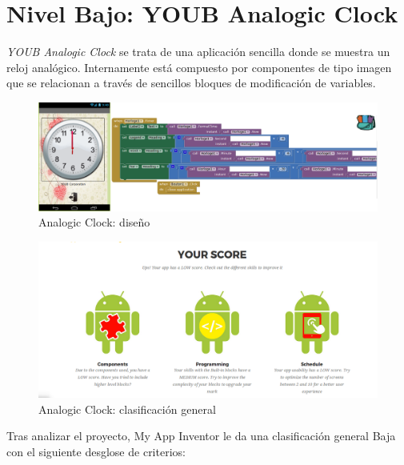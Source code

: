 \documentclass[a4paper, 12pt]{book}
\begin{document}
\section{Nivel Bajo: YOUB Analogic Clock} 
\textit{YOUB Analogic Clock} se trata de una aplicación sencilla donde se muestra un reloj analógico. Internamente está compuesto por componentes de tipo imagen que se relacionan a través de sencillos bloques de modificación de variables. 
\begin{figure}[H]
  \centering
  \includegraphics[width=\linewidth, keepaspectratio]{img/AnalogiClock}
  \caption{Analogic Clock: diseño}
  \label{fig:AnalogiClock}
\end{figure}
\begin{figure}[H]
  \centering
  \includegraphics[width=\linewidth, keepaspectratio]{img/AnalogiClockGlobal}
  \caption{Analogic Clock: clasificación general}
  \label{fig:AnalogiClockGLobal}
\end{figure}
Tras analizar el proyecto, My App Inventor le da una clasificación general Baja con el siguiente desglose de criterios:
\end{document}
